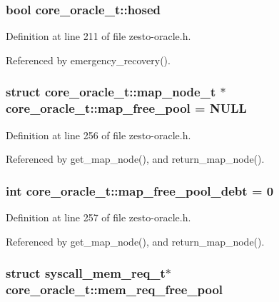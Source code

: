 \subsubsection[{hosed}]{\setlength{\rightskip}{0pt plus 5cm}bool {\bf core\_\-oracle\_\-t::hosed}}\label{classcore__oracle__t_d00e22e564a08b3912cf93f1e71a502d}




Definition at line 211 of file zesto-oracle.h.

Referenced by emergency\_\-recovery().
\subsubsection[{map\_\-free\_\-pool}]{\setlength{\rightskip}{0pt plus 5cm}struct {\bf core\_\-oracle\_\-t::map\_\-node\_\-t} $\ast$ {\bf core\_\-oracle\_\-t::map\_\-free\_\-pool} = NULL\hspace{0.3cm}{\tt  [static, read, protected]}}\label{classcore__oracle__t_ed152af32c6f582d03ee8a88f2f399a3}




Definition at line 256 of file zesto-oracle.h.

Referenced by get\_\-map\_\-node(), and return\_\-map\_\-node().
\subsubsection[{map\_\-free\_\-pool\_\-debt}]{\setlength{\rightskip}{0pt plus 5cm}int {\bf core\_\-oracle\_\-t::map\_\-free\_\-pool\_\-debt} = 0\hspace{0.3cm}{\tt  [static, protected]}}\label{classcore__oracle__t_2387b57848be51fa71ac1bd00797b4f9}




Definition at line 257 of file zesto-oracle.h.

Referenced by get\_\-map\_\-node(), and return\_\-map\_\-node().
\subsubsection[{mem\_\-req\_\-free\_\-pool}]{\setlength{\rightskip}{0pt plus 5cm}struct {\bf syscall\_\-mem\_\-req\_\-t}$\ast$ {\bf core\_\-oracle\_\-t::mem\_\-req\_\-free\_\-pool}\hspace{0.3cm}{\tt  [read, protected]}}\label{classcore__oracle__t_05c50ff07efc7d5f8fbf6bbfbb492b58}




